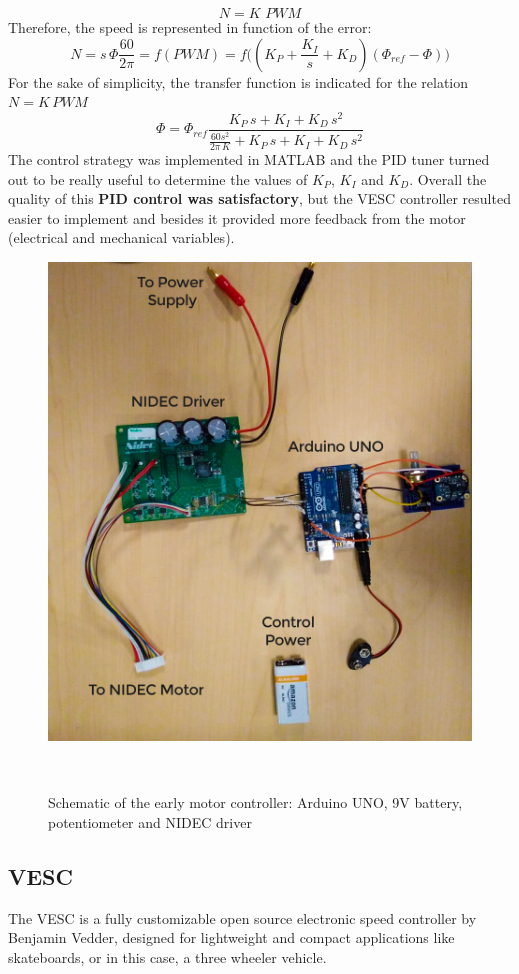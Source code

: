 \[N=K\,\,PWM\]
Therefore, the speed is represented in function of the error:
\[N=s\,\Phi \frac{60}{2\pi}=f(PWM)=f\big((K_{P}+\frac{K_{I}}{s}+K_{D})(\Phi_{ref}-\Phi)\big)\]
For the sake of simplicity, the transfer function is indicated for the relation $N=K\,PWM$
\[\Phi=\Phi_{ref}\frac{K_{P}\,s+K_{I}+K_{D}\,s^2}{\frac{60s^2}{2\pi\,K}+K_{P}\,s+K_{I}+K_{D}\,s^2}\]
The control strategy was implemented in MATLAB and the PID tuner turned out to be really useful to determine the values of $K_{P}$, $K_{I}$ and $K_{D}$. Overall the quality of this \textbf{PID control was satisfactory}, but the VESC controller resulted easier to implement and besides it provided more feedback from the motor (electrical and mechanical variables).
\begin{figure}[h!]
	\includegraphics[width=0.85\linewidth]{figs/05/own/IMG_20161231_132543}
	\caption{Schematic of the early motor controller: Arduino UNO, 9V battery, potentiometer and NIDEC driver}
	\\[-10cm]
\end{figure}

\newpage
\subsection{VESC}

The VESC is a fully customizable open source electronic speed controller by Benjamin Vedder, designed for lightweight and compact applications like skateboards, or in this case, a three wheeler vehicle.

